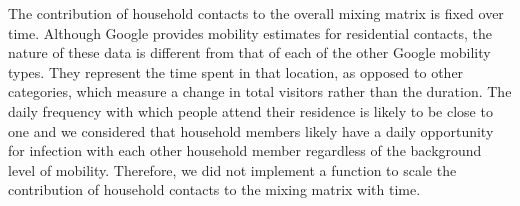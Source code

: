 The contribution of household contacts to the overall mixing matrix is fixed over time. Although Google provides mobility 
estimates for residential contacts, the nature of these data is different from that of each of the other Google mobility 
types. They represent the time spent in that location, as opposed to other categories, which measure a change in total visitors 
rather than the duration. The daily frequency with which people attend their residence is likely to be close to one and we 
considered that household members likely have a daily opportunity for infection with each other household member regardless of
the background level of mobility. Therefore, we did not implement a function to scale the contribution of household contacts 
to the mixing matrix with time.

